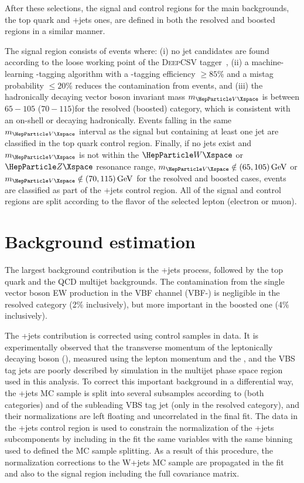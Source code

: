 After these selections, the signal and control regions for the main backgrounds, the top quark and {\PW}+jets ones, are
defined in both the resolved and boosted regions in a similar manner.

The signal region consists of events where:
(i) no {\PQb} jet candidates are found according to the loose working point
of the \textsc{DeepCSV} tagger~\cite{Sirunyan:2017ezt},
(ii) a machine-learning {\PQb}-tagging algorithm with a
{\PQb}-tagging efficiency $\ge85\%$ and a mistag probability $\le20\%$ reduces the contamination
from \ttbar events,
and (iii) the hadronically decaying vector boson
invariant mass $\mvhad$ is between $65-105$ ($70-115$)\GeV for the resolved (boosted) category, which is consistent with
an on-shell {\PW} or {\PZ} decaying hadronically.  Events falling in the same $\mvhad$ interval as the signal but
containing at least one {\PQb} jet are classified in the top quark control region.  Finally, if no {\PQb} jets exist and
$\mvhad$ is not within the $\PW$ or $\PZ$ resonance range, $\mvhad\notin(65 , 105)\GeV$ or $\mvhad\notin(70 , 115)\GeV$
for the resolved and boosted cases, events are classified as part of the {\PW}+jets control region.  All of the signal
and control regions are split according to the flavor of the selected lepton (electron or muon).


\section{Background estimation}\label{sec:5}

The largest background contribution is the {\PW}+jets process, followed by the top quark and the QCD multijet
backgrounds. The contamination from the single vector boson EW production in the VBF channel (VBF-{\PV}) is negligible
in the resolved category (2\% inclusively), but more important in the boosted one (4\% inclusively).

The {\PW}+jets contribution is corrected using control samples in data.  It is experimentally observed that the
transverse momentum of the leptonically decaying {\PW} boson (\wlpt), measured using the lepton momentum and
the \ptmiss, and the VBS tag jets \pt are poorly described by simulation in the multijet phase space region used in this
analysis.  To correct this important background in a differential way, the {\PW}+jets MC sample is split into several
subsamples according to \wlpt (both categories) and \pt of the subleading VBS tag jet (only in the resolved category),
and their normalizations are left floating and uncorrelated in the final fit. The data in the {\PW}+jets control region is used
to constrain the normalization of the {\PW}+jets subcomponents by including in the fit the same variables
with the same binning used to defined the MC sample splitting.
As a result of this procedure, the normalization corrections to the W+jets MC
sample are propagated in the fit and also to the signal region including the full covariance matrix.

